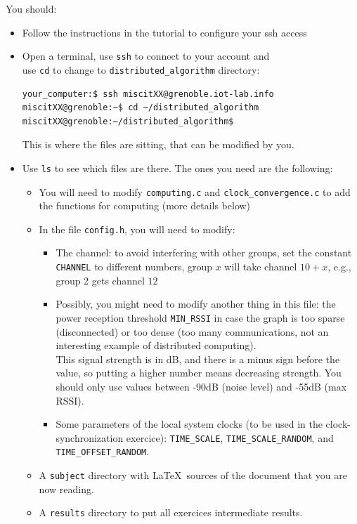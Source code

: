 \documentclass{article}
\begin{document}
You should:
\begin{itemize}
\item Follow the instructions in the tutorial to configure your ssh access
\item Open a terminal, use \verb=ssh= to connect to your account and \\
    use \verb=cd= to change to \verb=distributed_algorithm= directory:
    \begin{verbatim}your_computer:$ ssh miscitXX@grenoble.iot-lab.info
miscitXX@grenoble:~$ cd ~/distributed_algorithm
miscitXX@grenoble:~/distributed_algorithm$
\end{verbatim}
This is where the files are sitting, that can be modified by you.

\item Use \verb=ls= to see which files are there. The ones you need are the following:
	\begin{itemize}
	\item You will need to modify \verb=computing.c= and \verb=clock_convergence.c= to add the functions for computing (more details below)
	\item In the file \verb=config.h=, you will need to modify:
		\begin{itemize}

		\item The channel: to avoid interfering with other groups, set the
            constant \verb=CHANNEL= to different numbers, group $x$ will take
            channel $10+x$, e.g., group 2 gets channel $12$
		\item Possibly, you might  need to modify another thing in this file:
            the power reception threshold \verb=MIN_RSSI= in case the graph is
            too sparse (disconnected) or too dense (too many communications, not
            an interesting example of distributed computing).\\
            This signal strength is in dB, and there is a minus sign before the value,
            so putting a higher number means decreasing strength.
            You should only use values between -90dB (noise level) and -55dB (max RSSI).
         \item Some parameters of the local system clocks (to be used in the clock-synchronization exercice): \verb=TIME_SCALE=, \verb=TIME_SCALE_RANDOM=, and \verb=TIME_OFFSET_RANDOM=.
		\end{itemize}
    \item A \verb=subject= directory with \LaTeX~sources of the document that you are now reading.
    \item A \verb=results= directory to put all exercices intermediate results.
	\end{itemize}
\end{itemize}
\end{document}
